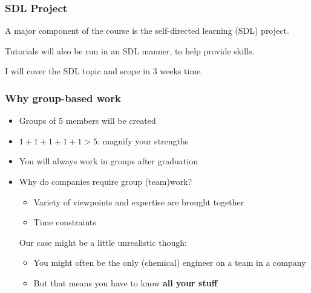 
\begin{frame}\frametitle{SDL Project}
	A major component of the course is the self-directed learning (SDL) project. 
	
	\vspace{12pt}
	Tutorials will also be run in an SDL manner, to help provide skills.
	
	\vspace{12pt}
	I will cover the SDL topic and scope in 3 weeks time.
\end{frame}

\begin{frame}\frametitle{Why group-based work}
	\begin{itemize}
		\item	Groups of 5 members will be created
		\item	$1+1+1+1+1 > 5$: magnify your strengths
		\item	You will always work in groups after graduation
		\item	Why do companies require group (team)work? 
		\begin{itemize}
			\item	Variety of viewpoints and expertise are brought together
			\item	Time constraints
		\end{itemize}	
		\vspace{12pt}
		\pause
		Our case might be a little unrealistic though:
		\begin{itemize}
			\item	You might often be the only (chemical) engineer on a team in a company
			\item	But that means you have to know \textbf{all your stuff}
		\end{itemize}
	\end{itemize}
\end{frame}


